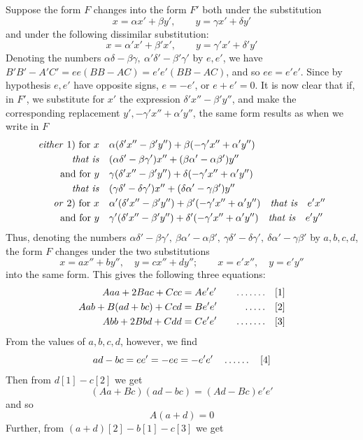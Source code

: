 Suppose the form $F$ changes into the form $F'$ both under the substitution
\[
x=\alpha x'+\beta y',\qquad y=\gamma x'+\delta y'
\]
and under the following dissimilar substitution:
\[
x=\alpha'x'+\beta'x',\qquad y=\gamma'x'+\delta'y'
\]
Denoting the numbers $\alpha\delta-\beta\gamma,\ \alpha'\delta'-\beta'\gamma'$ by $e,e'$, we have $B'B'-A'C'=ee(BB-AC)=e'e'(BB-AC)$, and so $ee=e'e'$. Since by hypothesis $e,e'$ have opposite signs, $e=-e'$, or $e+e'=0$. It is now clear that if, in $F'$, we substitute for $x'$ the expression $\delta'x''-\beta'y''$, and make the corresponding replacement $y',-\gamma'x''+\alpha'y''$, the same form results as when we write in $F$
\[
\begin{aligned}
\text{\textit{either} 1) for }x\quad&\alpha(\delta'x''-\beta'y'')+\beta(-\gamma'x''+\alpha'y'')\\
\text{\textit{that is}}\quad&(\alpha\delta'-\beta\gamma')x''+(\beta\alpha'-\alpha\beta')y''\\
\text{and for }y\quad&\gamma(\delta'x''-\beta'y'')+\delta(-\gamma'x''+\alpha'y'')\\
\text{\textit{that is}}\quad&(\gamma\delta'-\delta\gamma')x''+(\delta\alpha'-\gamma\beta')y''\\
\text{\textit{or} 2) for }x\quad&\alpha'(\delta'x''-\beta'y'')+\beta'(-\gamma'x''+\alpha'y'')\quad\text{\textit{that is}}\quad e'x''\\
\text{and for }y\quad&\gamma'(\delta'x''-\beta'y'')+\delta'(-\gamma'x''+\alpha'y'')\quad\text{\textit{that is}}\quad e'y''
\end{aligned}
\]
Thus, denoting the numbers $\alpha\delta'-\beta\gamma',\ \beta\alpha'-\alpha\beta',\ \gamma\delta'-\delta\gamma',\ \delta\alpha'-\gamma\beta'$ by $a,b,c,d$, the form $F$ changes under the two substitutions
\[
x=ax''+by'',\quad y=cx''+dy'';\qquad x=e'x'',\quad y=e'y''
\]
into the same form. This gives the following three equations:
\[
\begin{aligned}
Aaa+2Bac+Ccc&=Ae'e'&\quad\mathinner{.\,.\,.\,.\,.\,.\,.}\quad&[1]\\
Aab+B(ad+bc)+Ccd&=Be'e'&\quad\mathinner{.\,.\,.\,.\,.}\quad&[2]\\
Abb+2Bbd+Cdd&=Ce'e'&\quad\mathinner{.\,.\,.\,.\,.\,.\,.}\quad&[3]
\end{aligned}
\]
From the values of $a,b,c,d$, however, we find
\[
ad-bc=ee'=-ee=-e'e'\quad\mathinner{.\,.\,.\,.\,.\,.}\quad[4]
\]
Then from $d[1]-c[2]$ we get
\[
(Aa+Bc)(ad-bc)=(Ad-Bc)e'e'
\]
and so
\[
A(a+d)=0
\]
Further, from $(a+d)[2]-b[1]-c[3]$ we get

